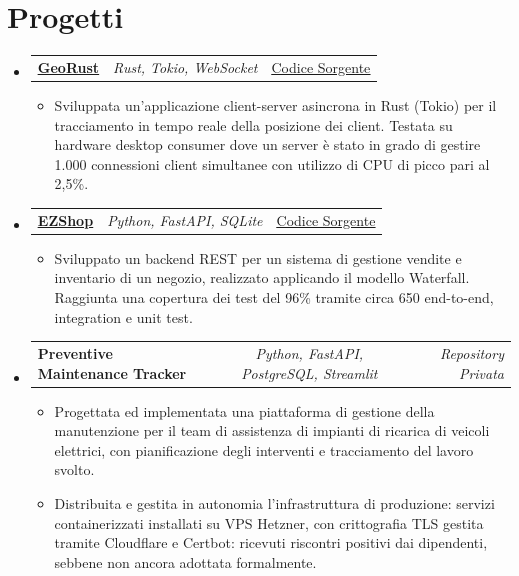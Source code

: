 \documentclass[a4paper,11pt]{article}
\makeatletter
\newcommand{\bodyfs}{\fontsize{10.3pt}{12.5pt}\selectfont}   %
\newcommand{\resumeItem}[1]{
  \item\bodyfs #1
}
\newcommand{\resumeItemListStart}{\begin{itemize}[leftmargin=1.4em, rightmargin=0pt, itemsep=1.5pt plus 1pt, topsep=2.5pt plus 1pt, parsep=0pt, partopsep=0pt]}
\newcommand{\resumeItemListEnd}{\end{itemize}}
\newcommand{\resumeTrioHeading}[3]{
  \item\bodyfs
    \begin{tabular*}{\linewidth}[t]{
      l@{\extracolsep{\fill}}c@{\extracolsep{\fill}}r
    }
      \textbf{#1} & \textit{#2} & #3
    \end{tabular*}
}
\newcommand{\resumeHeadingListStart}{
  \begin{itemize}[leftmargin=0pt, label={}, itemsep=6pt plus 3pt minus 1pt, topsep=0pt, parsep=0pt, partopsep=0pt]
}
\newcommand{\resumeHeadingListEnd}{\end{itemize}}
\makeatother
\begin{document}
\vfill
\section{Progetti}
  \resumeHeadingListStart{}
    \resumeTrioHeading{\href{https://github.com/amedeo03/georust}{\uline{GeoRust}}}{Rust, Tokio, WebSocket}{\href{https://github.com/amedeo03/georust}{\uline{Codice Sorgente}}}
      \resumeItemListStart{}
        \resumeItem{Sviluppata un'applicazione client-server asincrona in Rust (Tokio) per il tracciamento in tempo reale della posizione dei client. Testata su hardware desktop consumer dove un server è stato in grado di gestire 1.000 connessioni client simultanee con utilizzo di CPU di picco pari al 2,5\%.}
      \resumeItemListEnd{}

    \resumeTrioHeading{\href{https://github.com/amedeo03/EZShop}{\uline{EZShop}}}{Python, FastAPI, SQLite}{\href{https://github.com/amedeo03/EZShop}{\uline{Codice Sorgente}}}
      \resumeItemListStart{}
        \resumeItem{Sviluppato un backend REST per un sistema di gestione vendite e inventario di un negozio, realizzato applicando il modello Waterfall. Raggiunta una copertura dei test del 96\% tramite circa 650 end-to-end, integration e unit test.}
      \resumeItemListEnd{}

    \resumeTrioHeading{Preventive Maintenance Tracker}{Python, FastAPI, PostgreSQL, Streamlit}{\textit{Repository Privata}}
      \resumeItemListStart{}
        \resumeItem{Progettata ed implementata una piattaforma di gestione della manutenzione per il team di assistenza di impianti di ricarica di veicoli elettrici, con pianificazione degli interventi e tracciamento del lavoro svolto.}
        \resumeItem{Distribuita e gestita in autonomia l'infrastruttura di produzione: servizi containerizzati installati su VPS Hetzner, con crittografia TLS gestita tramite Cloudflare e Certbot: ricevuti riscontri positivi dai dipendenti, sebbene non ancora adottata formalmente.}
      \resumeItemListEnd{}
  \resumeHeadingListEnd{}
\end{document}
